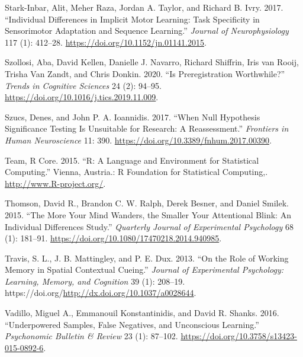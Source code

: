 \documentclass{article}
\newlength{\cslhangindent}
\newlength{\cslentryspacingunit} %
\newenvironment{CSLReferences}[2] %
 {%
  \setlength{\parindent}{0pt}
  \ifodd #1
  \let\oldpar\par
  \def\par{\hangindent=\cslhangindent\oldpar}
  \fi
  \setlength{\parskip}{#2\cslentryspacingunit}
 }%
 {}
\begin{document}
\begin{CSLReferences}{1}{0}
\leavevmode{}%
Stark-Inbar, Alit, Meher Raza, Jordan A. Taylor, and Richard B. Ivry. 2017. {``Individual Differences in Implicit Motor Learning: Task Specificity in Sensorimotor Adaptation and Sequence Learning.''} \emph{Journal of Neurophysiology} 117 (1): 412--28. \url{https://doi.org/10.1152/jn.01141.2015}.

\leavevmode{}%
Szollosi, Aba, David Kellen, Danielle J. Navarro, Richard Shiffrin, Iris van Rooij, Trisha Van Zandt, and Chris Donkin. 2020. {``Is {Preregistration} {Worthwhile}?''} \emph{Trends in Cognitive Sciences} 24 (2): 94--95. \url{https://doi.org/10.1016/j.tics.2019.11.009}.

\leavevmode{}%
Szucs, Denes, and John P. A. Ioannidis. 2017. {``When {Null} {Hypothesis} {Significance} {Testing} {Is} {Unsuitable} for {Research}: {A} {Reassessment}.''} \emph{Frontiers in Human Neuroscience} 11: 390. \url{https://doi.org/10.3389/fnhum.2017.00390}.

\leavevmode{}%
Team, R Core. 2015. {``R: {A} Language and Environment for Statistical Computing.''} Vienna, Austria.: R Foundation for Statistical Computing,. \url{http://www.R-project.org/}.

\leavevmode{}%
Thomson, David R., Brandon C. W. Ralph, Derek Besner, and Daniel Smilek. 2015. {``The More Your Mind Wanders, the Smaller Your Attentional Blink: {An} Individual Differences Study.''} \emph{Quarterly Journal of Experimental Psychology} 68 (1): 181--91. \url{https://doi.org/10.1080/17470218.2014.940985}.

\leavevmode{}%
Travis, S. L., J. B. Mattingley, and P. E. Dux. 2013. {``On the Role of Working Memory in Spatial Contextual Cueing.''} \emph{Journal of Experimental Psychology: Learning, Memory, and Cognition} 39 (1): 208--19. https://doi.org/\url{http://dx.doi.org/10.1037/a0028644}.

\leavevmode{}%
Vadillo, Miguel A., Emmanouil Konstantinidis, and David R. Shanks. 2016. {``Underpowered Samples, False Negatives, and Unconscious Learning.''} \emph{Psychonomic Bulletin \& Review} 23 (1): 87--102. \url{https://doi.org/10.3758/s13423-015-0892-6}.


\end{CSLReferences}
\end{document}
